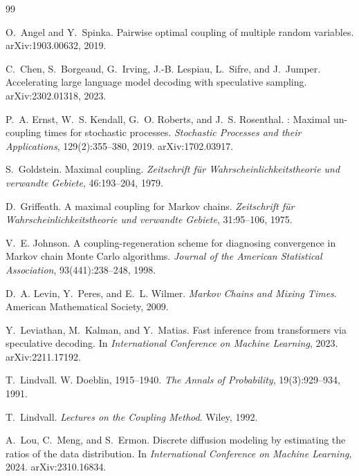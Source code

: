 \documentclass[11pt]{article}
\theoremstyle{definition}
\begin{document}
\begin{thebibliography}{99}\small

O.~Angel and Y.~Spinka.
\newblock Pairwise optimal coupling of multiple random variables.
\newblock arXiv:1903.00632, 2019.

C.~Chen, S.~Borgeaud, G.~Irving, J.-B. Lespiau, L.~Sifre, and J.~Jumper.
\newblock Accelerating large language model decoding with speculative sampling.
\newblock arXiv:2302.01318, 2023.

P.~A. Ernst, W.~S. Kendall, G.~O. Roberts, and J.~S. Rosenthal.
: Maximal un-coupling times for stochastic processes.
\newblock \emph{Stochastic Processes and their Applications}, 129(2):355--380, 2019.
\newblock arXiv:1702.03917.

S.~Goldstein.
\newblock Maximal coupling.
\newblock \emph{Zeitschrift f\"ur Wahrscheinlichkeitstheorie und verwandte Gebiete}, 46:193--204, 1979.

D.~Griffeath.
\newblock A maximal coupling for {M}arkov chains.
\newblock \emph{Zeitschrift f\"ur Wahrscheinlichkeitstheorie und verwandte Gebiete}, 31:95--106, 1975.

V.~E. Johnson.
\newblock A coupling-regeneration scheme for diagnosing convergence in {M}arkov chain {M}onte {C}arlo algorithms.
\newblock \emph{Journal of the American Statistical Association}, 93(441):238--248, 1998.

D.~A. Levin, Y.~Peres, and E.~L. Wilmer.
\newblock \emph{Markov Chains and Mixing Times}.
\newblock American Mathematical Society, 2009.

Y.~Leviathan, M.~Kalman, and Y.~Matias.
\newblock Fast inference from transformers via speculative decoding.
\newblock In \emph{International Conference on Machine Learning}, 2023.
\newblock arXiv:2211.17192.

T.~Lindvall.
\newblock W. {D}oeblin, 1915--1940.
\newblock \emph{The Annals of Probability}, 19(3):929--934, 1991.

T.~Lindvall.
\newblock \emph{Lectures on the Coupling Method}.
\newblock Wiley, 1992.

A.~Lou, C.~Meng, and S.~Ermon.
\newblock Discrete diffusion modeling by estimating the ratios of the data distribution.
\newblock In \emph{International Conference on Machine Learning}, 2024.
\newblock arXiv:2310.16834.


\end{thebibliography}
\end{document}
